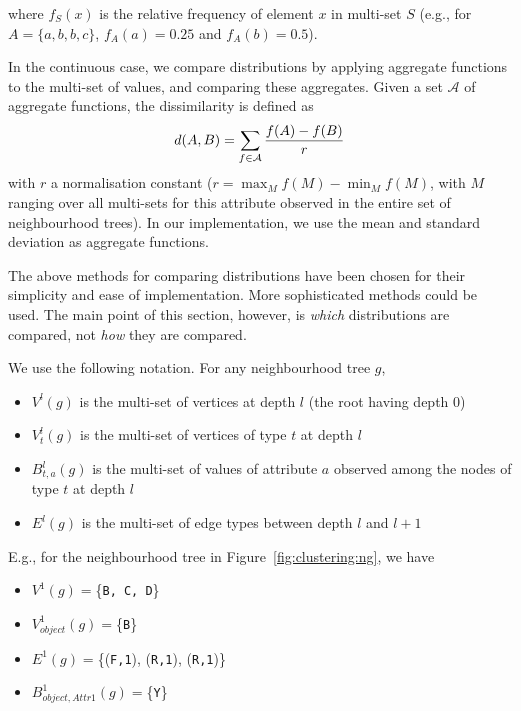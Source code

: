 \noindent where $f_S(x)$ is the relative frequency of element $x$ in multi-set $S$ (e.g., for $A=\{a,b,b,c\}$, $f_A(a)=0.25$ and $f_A(b)=0.5$).


In the continuous case, we compare distributions by applying aggregate functions to the multi-set of values, and comparing these aggregates.
Given a set $\mathcal{A}$ of aggregate functions, the dissimilarity is defined as
\begin{equation}
    d(A,B) = \sum_{f \in \mathcal{A}} {f(A)-f(B) \over r }
\end{equation}
with $r$ a normalisation constant ($r = \max_M f(M) - \min_M f(M)$, with $M$ ranging over all multi-sets for this attribute observed in the entire set of neighbourhood trees).
In our implementation, we use the mean and standard deviation as aggregate functions.


The above methods for comparing distributions have been chosen for their simplicity and ease of implementation.  More sophisticated methods could be used.
The main point of this section, however, is {\em which} distributions are compared, not {\em how} they are compared.


We use the following notation.  For any neighbourhood tree $g$,
\begin{itemize}
\item[\textbullet] $V^l(g)$ is the multi-set of vertices at depth $l$ (the root having depth 0)
\item[\textbullet] $V^l_t(g)$ is the multi-set of vertices of type $t$ at depth $l$
\item[\textbullet] $B^l_{t,a}(g)$ is the multi-set of values of attribute $a$ observed among the nodes of type $t$ at depth $l$
\item[\textbullet] $E^l(g)$ is the multi-set of edge types between depth $l$ and $l+1$
\end{itemize}

E.g., for the neighbourhood tree in Figure~\ref{fig:clustering:ng}, we have
\begin{itemize}
    \item[\textbullet] $V^1(g) = $\{\texttt{B, C, D}\}
    \item[\textbullet] $V^1_{object}(g) = $\{\texttt{B}\}
    \item[\textbullet] $E^1(g) = $\{(\texttt{F,1}), (\texttt{R,1}), (\texttt{R,1})\}
    \item[\textbullet] $B^1_{object,Attr1}(g) = $\{\texttt{Y}\}
\end{itemize}






